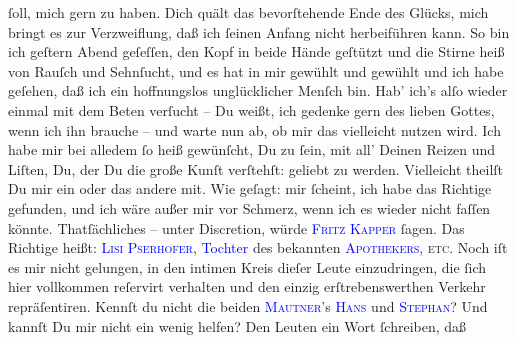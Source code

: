                ſoll, mich gern zu haben. Dich quält das bevorſtehende Ende des Glücks, mich bringt
               es zur Verzweiflung, daß ich ſeinen Anfang nicht herbeiführen kann. So bin ich geſtern{ }Abend geſeſſen, den Kopf in beide Hände geſtützt und die Stirne heiß von
               Rauſch und Sehnſucht, und es hat in mir gewühlt und gewühlt und ich habe geſehen, daß
               ich ein hoffnungslos unglücklicher Menſch bin. Hab’ ich’s alſo wieder einmal mit dem
               Beten verſucht – Du weißt, ich gedenke gern des lieben Gottes, wenn ich ihn brauche –
               und warte nun ab, ob mir das vielleicht nutzen wird. Ich habe mir bei alledem ſo heiß
               gewünſcht, Du zu ſein, mit all' Deinen Reizen und \strikeout{\textcolor{gray}{Liſten}} Liſten, Du, der Du die große Kunſt verſtehſt: geliebt zu werden. Vielleicht
               theilſt Du mir ein oder das andere \label{K_L02649-3v}\label{K_L02649-3h} mit. Wie
               geſagt: mir ſcheint, ich habe das Richtige gefunden, und ich wäre außer mir vor
               Schmerz, wenn ich es wieder nicht faſſen könnte.\pend
           \pstart
           Thatſächliches – unter Discretion, würde \textsc{\textcolor{blue}{Fritz Kapper}{}\ledrightnote{\textcolor{blue}{Friedrich Kapper}}} ſagen. Das Richtige heißt: {\pb}\textsc{\textcolor{blue}{Lisi Pserhofer}{}\ledrightnote{\textcolor{blue}{Elise Pserhofer}}}, \textcolor{blue}{Tochter}{} des bekannten
                  \textsc{\textcolor{blue}{Apothekers}{}}, \label{K_L02649-11v}\label{K_L02649-11h}{ }\textsc{etc}. Noch iſt es mir nicht gelungen, in den intimen Kreis
               dieſer Leute einzudringen, die ſich hier vollkommen reſervirt verhalten\strikeout{,} und den einzig erſtrebenswerthen Verkehr
               repräſentiren. Kennſt du nicht die beiden \textsc{\textcolor{blue}{Mautner}{}}’s \strikeout{,}{ }\textsc{\textcolor{blue}{Hans}{}\ledrightnote{\textcolor{blue}{Hans Johann von Mauthner}}} und \textsc{\textcolor{blue}{Stephan}{}\ledrightnote{\textcolor{blue}{Stephan von Mauthner}}}? Und kannſt Du mir nicht ein wenig helfen? Den Leuten ein Wort ſchreiben, daß
